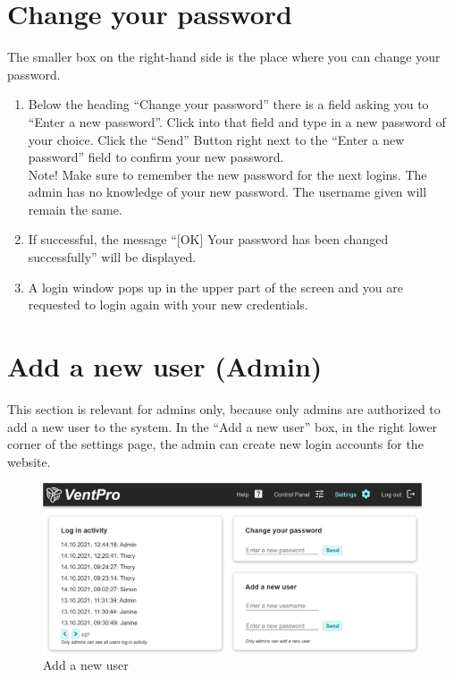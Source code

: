\newpage
\section{Change your password}
\label{sec:change_your_password}

The smaller box on the right-hand side is the place where you can change your password.

\begin{enumerate}[wide,  labelwidth=0.3cm,  labelindent=0pt, leftmargin=0.5cm]
\item Below the heading “Change your password” there is a field asking you to “Enter a new password”. Click into that field and type in a new password of your choice. Click the “Send” Button right next to the “Enter a new password” field to confirm your new password.\\
\color{red}
Note! Make sure to remember the new password for the next logins. The admin has no knowledge of your new password. The username given will remain the same.
\color{black}

\item If successful, the message “[OK] Your password has been changed successfully” will be displayed.
\item A login window pops up in the upper part of the screen and you are requested to login again with your new credentials.
\end{enumerate}



\section{Add a new user (Admin)}
\label{sec:add_a_new_user}

This section is relevant for admins only, because only admins are authorized to add a new user to the system. In the “Add a new user” box, in the right lower corner of the settings page, the admin can create new login accounts for the website.

\begin{figure}[h]
\centering
\includegraphics[width=1.0\textwidth]{img/Picture7-1}
\caption{Add a new user}
\label{fig:picture_7}
\end{figure}

